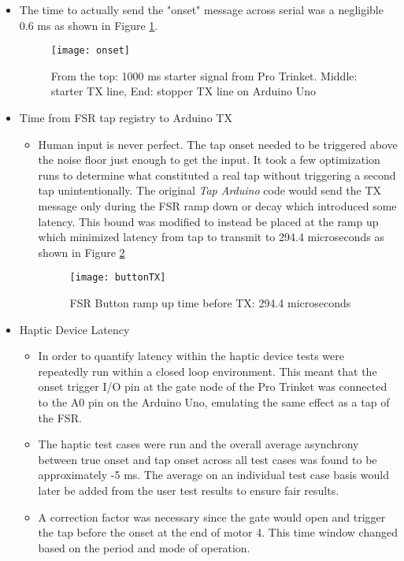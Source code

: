 \begin{itemize}
\begin{itemize}
\begin{itemize}
        \end{itemize}
    \end{itemize}
    \item The time to actually send the "onset" message across serial was a negligible 0.6 ms as shown in Figure \ref{fig:onsetMessage}.
    \begin{figure}[H] 
        \centering
        \texttt{[image: onset]}
        \caption{From the top: 1000 ms starter signal from Pro Trinket. Middle: starter TX line, End: stopper TX line on Arduino Uno}
        \label{fig:onsetMessage}
    \end{figure}
    \item Time from FSR tap registry to Arduino TX \label{FSRregistry}
    \begin{itemize}
        \item Human input is never perfect. The tap onset needed to be triggered above the noise floor just enough to get the input. It took a few optimization runs to determine what constituted a real tap without triggering a second tap unintentionally. The original \textit{Tap Arduino} code would send the TX message only during the FSR ramp down or decay which introduced some latency. This bound was modified to instead be placed at the ramp up which minimized latency from tap to transmit to 294.4 microseconds as shown in Figure \ref{fig:buttonTX}
        \begin{figure}[H]
            \centering
            \texttt{[image: buttonTX]}
            \caption{FSR Button ramp up time before TX: 294.4 microseconds}
            \label{fig:buttonTX}
        \end{figure}
    \end{itemize}
    \item Haptic Device Latency
    \begin{itemize}
        \item In order to quantify latency within the haptic device tests were repeatedly run within a closed loop environment. This meant that the onset trigger I/O pin at the gate node of the Pro Trinket was connected to the A0 pin on the Arduino Uno, emulating the same effect as a tap of the FSR.
        \item The haptic test cases were run and the overall average asynchrony between true onset and tap onset across all test cases was found to be approximately -5 ms. The average on an individual test case basis would later be added from the user test results to ensure fair results.
        \item A correction factor was necessary since the gate would open and trigger the tap before the onset at the end of motor 4. This time window changed based on the period and mode of operation.

\end{itemize}
\end{itemize}
